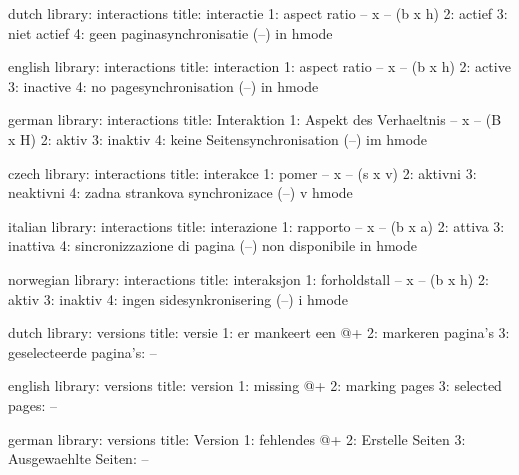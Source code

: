 


\startmessages  dutch  library: interactions
  title: interactie
      1: aspect ratio -- x -- (b x h)
      2: actief
      3: niet actief
      4: geen paginasynchronisatie (--) in hmode
\stopmessages

\startmessages  english  library: interactions
  title: interaction
      1: aspect ratio -- x -- (b x h)
      2: active
      3: inactive
      4: no pagesynchronisation (--) in hmode
\stopmessages

\startmessages  german  library: interactions
  title: Interaktion
      1: Aspekt des Verhaeltnis -- x -- (B x H)
      2: aktiv
      3: inaktiv
      4: keine Seitensynchronisation (--) im hmode
\stopmessages

\startmessages  czech  library: interactions
  title: interakce
      1: pomer -- x -- (s x v)
      2: aktivni
      3: neaktivni
      4: zadna strankova synchronizace (--) v hmode
\stopmessages

\startmessages  italian  library: interactions
  title: interazione
      1: rapporto -- x -- (b x a)
      2: attiva
      3: inattiva
      4: sincronizzazione di pagina (--) non disponibile in hmode
\stopmessages

\startmessages  norwegian  library: interactions
  title: interaksjon
      1: forholdstall -- x -- (b x h)
      2: aktiv
      3: inaktiv
      4: ingen sidesynkronisering (--) i hmode
\stopmessages

\startmessages  dutch  library: versions
  title: versie
      1: er mankeert een @+
      2: markeren pagina's
      3: geselecteerde pagina's: --
\stopmessages

\startmessages  english  library: versions
  title: version
      1: missing @+
      2: marking pages
      3: selected pages: --
\stopmessages

\startmessages  german  library: versions
  title: Version
      1: fehlendes @+
      2: Erstelle Seiten
      3: Ausgewaehlte Seiten: --
\stopmessages

